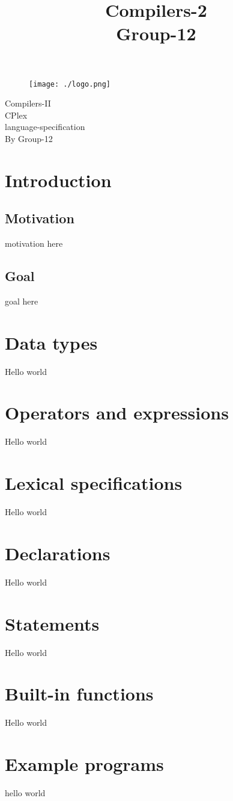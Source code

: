 \documentclass[12pt]{article}
\title{Compilers-2\\Group-12}
\date{}
\begin{document}
\begin{figure}[H]
    \centering 
    \texttt{[image: ./logo.png]}
    \label{fig:my_label}
\end{figure}
\vspace{1cm}
\begin{center}
    {\fontsize{35}{30}\selectfont Compilers-II}\\
    \vspace{2cm}
    {\fontsize{35}{30}\selectfont CPlex}\\
    \vspace{0.5cm}
    {\fontsize{25}{30}\selectfont language-specification}\\
    \vspace{1cm}
    {\fontsize{30}{30}\selectfont By Group-12}\\
\end{center}
\pagebreak
\begin{center}
    \tableofcontents
\end{center}
\pagebreak
\section{Introduction}
\subsection{Motivation}
motivation here
\subsection{Goal}
goal here
\section{Data types}
Hello world 
\section{Operators and expressions}
Hello world 
\section{Lexical specifications}
Hello world 
\section{Declarations}
Hello world 
\section{Statements}
Hello world 
\section{Built-in functions}
Hello world 
\section{Example programs}
hello world 
\end{document}
